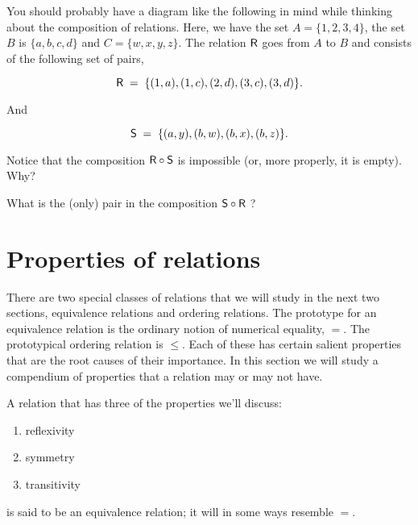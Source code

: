  
You should probably have a diagram like the following in mind while thinking
about the composition of relations.  Here, we have the set $A=\{1,2,3,4\}$,
the set $B$ is $\{a,b,c,d\}$ and $C=\{w,x,y,z\}$.  The relation
$\mbox{\textsf R}$ goes from $A$ to $B$ and consists of the following set of pairs,

\[ \mbox{\textsf R} \; = \; \{(1,a), (1,c), (2,d), (3,c), (3,d) \}. \]

And 

\[ \mbox{\textsf S} \; = \; \{(a,y), (b,w), (b,x), (b,z) \}. \]

\vfill



\begin{exer}
Notice that the composition $\mbox{\textsf R} \circ \mbox{\textsf S}$ is impossible (or, more
properly, it is empty).  Why?

What is the (only) pair in the composition $\mbox{\textsf S} \circ \mbox{\textsf R}$ ?
\end{exer}

\newpage





\newpage

\section{Properties of relations}

There are two special classes of relations that we will study
in the next two sections, equivalence relations and ordering relations.
The prototype for an equivalence relation is the ordinary notion
of numerical equality, $=$.  The prototypical ordering relation
is $\leq$.  Each of these has certain salient properties that are the
root causes of their importance.  In this section we will study a 
compendium of properties that a relation may or may not have.  

A relation that has three of the properties we'll discuss:

\begin{enumerate}
\item {} reflexivity 
\item {}symmetry 
\item {}transitivity
\end{enumerate}

\noindent is said to be an equivalence relation; it will in some ways resemble
$=$.

